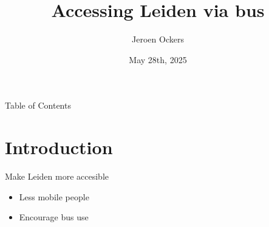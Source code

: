 \documentclass[9pt, aspectratio=43, english]{beamer}
\title{Accessing Leiden via bus}
\subtitle{}
\author{Jeroen Ockers}
\institute{Universiteit Leiden}
\date{May 28th, 2025}
\begin{document}


\begin{frame}[plain]
  \maketitle
\end{frame}
\addtocounter{framenumber}{-1}%


\begin{frame}{Table of Contents}
  \tableofcontents[sectionstyle=show/show, hideallsubsections]
\end{frame}


\section{Introduction}
\begin{frame}{Make Leiden more accesible}
  \begin{itemize}
    \item Less mobile people
    \item Encourage bus use
  \end{itemize}
\end{frame}
\end{document}

